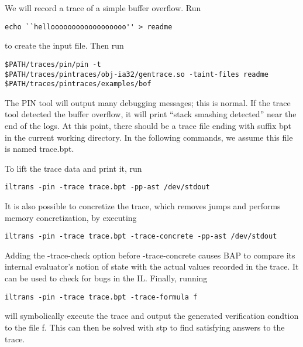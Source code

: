We will record a trace of a simple buffer overflow.  Run 

\begin{verbatim}
echo ``helloooooooooooooooooo'' > readme
\end{verbatim}

 to create the input file.  Then run 

\begin{verbatim}
$PATH/traces/pin/pin -t 
$PATH/traces/pintraces/obj-ia32/gentrace.so -taint-files readme
$PATH/traces/pintraces/examples/bof
\end{verbatim}

The PIN tool will output
many debugging messages; this is normal.  If the trace tool detected
the buffer overflow, it will print ``stack smashing detected'' near
the end of the logs.  At this point, there should be a trace file
ending with suffix bpt in the current working directory.  In the
following commands, we assume this file is named trace.bpt.

To lift the trace data and print it, run 

\begin{verbatim}
iltrans -pin -trace trace.bpt -pp-ast /dev/stdout
\end{verbatim}

It is also possible to concretize the trace, which removes jumps and performs
memory concretization, by executing 

\begin{verbatim}
iltrans -pin -trace trace.bpt -trace-concrete -pp-ast /dev/stdout
\end{verbatim}

Adding the -trace-check option before -trace-concrete causes BAP to compare its
internal evaluator's notion of state with the actual values recorded in the
trace.  It can be used to check for bugs in the IL.  Finally, running 

\begin{verbatim}
iltrans -pin -trace trace.bpt -trace-formula f
\end{verbatim}

will symbolically execute the trace and output the generated verification
condtion to the file f. This can then be solved with stp to find satisfying
answers to the trace.
